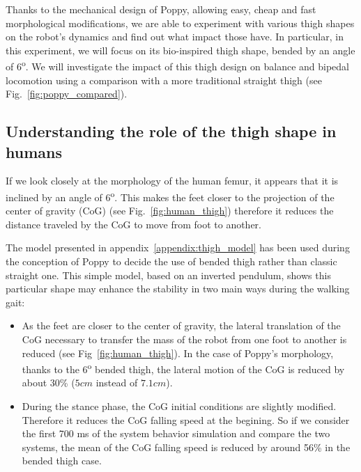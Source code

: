 Thanks to the mechanical design of Poppy, allowing easy, cheap and fast morphological modifications, we are able to experiment with various thigh shapes on the robot’s dynamics and find out what impact those have. In particular, in this experiment, we will focus on its bio-inspired thigh shape, bended by an angle of 6\textsuperscript{o}. We will investigate the impact of this thigh design on balance and bipedal locomotion using a comparison with a more traditional straight thigh (see Fig.~\ref{fig:poppy_compared}).



\subsection{Understanding the role of the thigh shape in humans} %

If we look closely at the morphology of the human femur, it appears that it is inclined by an angle of 6\textsuperscript{o}. This makes the feet closer to the projection of the center of gravity (CoG) (see Fig.~\ref{fig:human_thigh}) therefore it reduces the distance traveled by the CoG to move from foot to another.

The model presented in appendix~\ref{appendix:thigh_model} has been used during the conception of Poppy to decide the use of bended thigh rather than classic straight one. This simple model, based on an inverted pendulum, shows this particular shape may enhance the stability in two main ways during the walking gait:

\begin{itemize}
    \item As the feet are closer to the center of gravity, the lateral translation of the CoG necessary to transfer the mass of the robot from one foot to another is reduced (see Fig~\ref{fig:human_thigh}). In the case of Poppy's morphology, thanks to the $6$\textsuperscript{o} bended thigh, the lateral motion of the CoG is reduced by about 30\% ($ 5 cm$ instead of $7.1 cm$).
    \item During the stance phase, the CoG initial conditions are slightly modified. Therefore it reduces the CoG falling speed at the begining. So if we consider the first 700 ms of the system behavior simulation and compare the two systems, the mean of the CoG falling speed is reduced by around 56\% in the bended thigh case.
\end{itemize}


